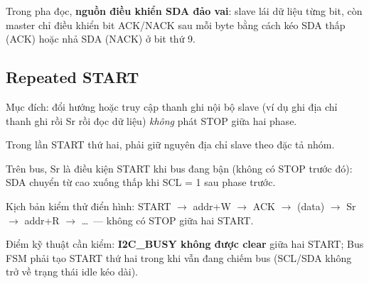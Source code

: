 Trong pha đọc, \textbf{nguồn điều khiển SDA đảo vai}: slave lái dữ liệu từng bit, còn master chỉ điều khiển bit ACK/NACK sau mỗi byte bằng cách kéo SDA thấp (ACK) hoặc nhả SDA (NACK) ở bit thứ 9.

\subsection{Repeated START}
Mục đích: đổi hướng hoặc truy cập thanh ghi nội bộ slave (ví dụ ghi địa chỉ thanh ghi rồi Sr rồi đọc dữ liệu) \emph{không} phát STOP giữa hai phase.

Trong lần START thứ hai, phải giữ nguyên địa chỉ slave theo đặc tả nhóm.

Trên bus, Sr là điều kiện START khi bus đang bận (không có STOP trước đó): SDA chuyển từ cao xuống thấp khi SCL = 1 sau phase trước.

Kịch bản kiểm thử điển hình: START $\rightarrow$ addr+W $\rightarrow$ ACK $\rightarrow$ (data) $\rightarrow$ Sr $\rightarrow$ addr+R $\rightarrow$ \ldots\ — không có STOP giữa hai START.

Điểm kỹ thuật cần kiểm: \textbf{I2C\_BUSY không được clear} giữa hai START; Bus FSM phải tạo START thứ hai trong khi vẫn đang chiếm bus (SCL/SDA không trở về trạng thái idle kéo dài).

